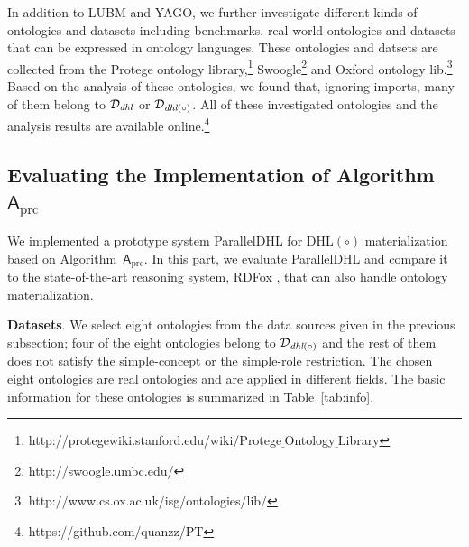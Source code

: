 In addition to LUBM and YAGO, we further investigate different kinds of ontologies and datasets
including benchmarks, real-world ontologies and datasets that can be expressed in ontology languages.
These ontologies and datsets are collected from the Protege ontology library,\footnote{http://protegewiki.stanford.edu/wiki/Protege$\underline{~}$Ontology$\underline{~}$Library}
Swoogle\footnote{http://swoogle.umbc.edu/} and Oxford ontology lib.\footnote{http://www.cs.ox.ac.uk/isg/ontologies/lib/}
Based on the analysis of these ontologies, we found that, ignoring imports, many of them
belong to $\mathcal{D}_{\textit{\text{dhl}}}$ or $\mathcal{D}_{\textit{\text{dhl}}(\circ)}$.
All of these investigated ontologies and the analysis results are available online.\footnote{https://github.com/quanzz/PT}


\subsection{Evaluating the Implementation of Algorithm~$\mathsf{A}_{\text{prc}}$}

We implemented a prototype system ParallelDHL for DHL$(\circ)$ materialization
based on Algorithm~$\mathsf{A}_{\text{prc}}$. In this part, we evaluate ParallelDHL and
compare it to the state-of-the-art reasoning system, RDFox \cite{MotikNPHO14},
that can also handle ontology materialization.

\textbf{Datasets}.
We select eight ontologies from the data sources given in the previous subsection;
four of the eight ontologies belong to $\mathcal{D}_{\textit{\text{dhl}}(\circ)}$ and
the rest of them does not satisfy the simple-concept or the simple-role
restriction.
The chosen eight ontologies are real ontologies and are applied in different fields.
The basic information for these ontologies
is summarized in Table~\ref{tab:info}.

